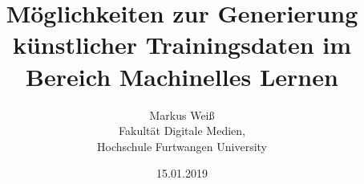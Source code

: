 \documentclass[a4paper,12pt]{scrreprt}
\begin{document}
\pagestyle{empty}

\cleardoubleoddpage

\pagestyle{fancy}



\title{Möglichkeiten zur Generierung künstlicher Trainingsdaten im Bereich Machinelles Lernen}
\date{15.01.2019}
\author{
Markus Weiß\\
Fakultät Digitale Medien,\\
Hochschule Furtwangen University\\
}

\maketitle









\end{document}
